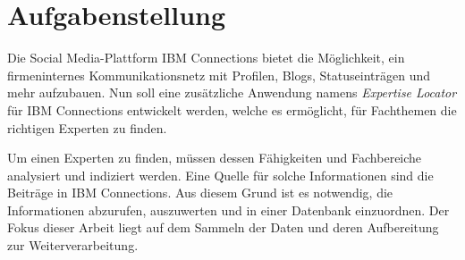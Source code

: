 
\chapter{Aufgabenstellung}
\large
Die Social Media-Plattform IBM Connections bietet die Möglichkeit, ein firmeninternes Kommunikationsnetz mit Profilen, Blogs, Statuseinträgen und mehr aufzubauen. Nun soll eine zusätzliche Anwendung namens \textit{Expertise Locator} für IBM Connections entwickelt werden, welche es ermöglicht, für Fachthemen die richtigen Experten zu finden.

Um einen Experten zu finden, müssen dessen Fähigkeiten und Fachbereiche analysiert und indiziert werden. Eine Quelle für solche Informationen sind die Beiträge in IBM Connections. Aus diesem Grund ist es notwendig, die Informationen abzurufen, auszuwerten und in einer Datenbank einzuordnen. Der Fokus dieser Arbeit liegt auf dem Sammeln der Daten und deren Aufbereitung zur Weiterverarbeitung.
\newpage